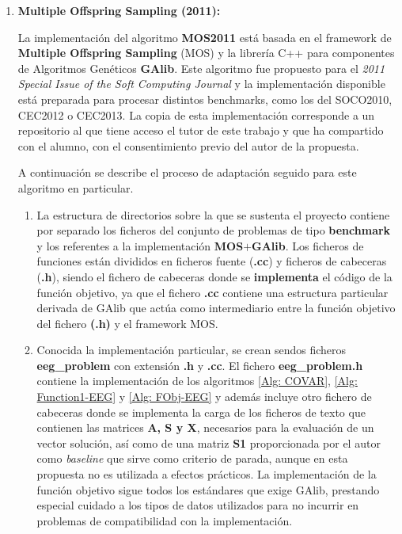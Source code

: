 \begin{enumerate}
	\item \textbf{Multiple Offspring Sampling (2011):}
	
	La implementación del algoritmo \textbf{MOS2011}\cite{MOS2010,MOS-Algorithms} está basada en el framework de \textbf{Multiple Offspring Sampling} (MOS)\cite{MOS-Framework} y la librería C++ para componentes de Algoritmos Genéticos \textbf{GAlib}\cite{GALib}. Este algoritmo fue propuesto para el \textit{2011 Special Issue of the Soft Computing Journal} y la implementación disponible está preparada para procesar distintos benchmarks, como los del SOCO2010, CEC2012 o CEC2013. La copia de esta implementación corresponde a un repositorio\cite{MOS-Algorithms} al que tiene acceso el tutor de este trabajo y que ha compartido con el alumno, con el consentimiento previo del autor de la propuesta.
	
	A continuación se describe el proceso de adaptación seguido para este algoritmo en particular.
	
	\begin{enumerate}
		\item La estructura de directorios sobre la que se sustenta el proyecto contiene por separado los ficheros del conjunto de problemas de tipo \textbf{benchmark} y los referentes a la implementación \textbf{MOS$+$GAlib}. Los ficheros de funciones están divididos en ficheros fuente (\textbf{.cc}) y ficheros de cabeceras (\textbf{.h}), siendo el fichero de cabeceras donde se \textbf{implementa} el código de la función objetivo, ya que el fichero \textbf{.cc} contiene una estructura particular derivada de GAlib que actúa como intermediario entre la función objetivo del fichero \textbf{(.h)} y el framework MOS.
		
		\item Conocida la implementación particular, se crean sendos ficheros \textbf{eeg\_problem} con extensión \textbf{.h} y \textbf{.cc}. El fichero \textbf{eeg\_problem.h} contiene la implementación de los algoritmos \ref{Alg: COVAR}, \ref{Alg: Function1-EEG} y \ref{Alg: FObj-EEG} y además incluye otro fichero de cabeceras donde se implementa la carga de los ficheros de texto que contienen las matrices \textbf{A, S y X}, necesarios para la evaluación de un vector solución, así como de una matriz \textbf{S1} proporcionada por el autor como \textit{baseline} que sirve como criterio de parada, aunque en esta propuesta no es utilizada a efectos prácticos. La implementación de la función objetivo sigue todos los estándares que exige GAlib, prestando especial cuidado a los tipos de datos utilizados para no incurrir en problemas de compatibilidad con la implementación.
		

\end{enumerate}
\end{enumerate}
